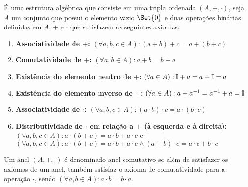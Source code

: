 \documentclass[../../main]{subfiles}
\begin{document}
    \begin{defi}[Anel]\label{defi:anel}
        É uma estrutura algébrica que consiste em uma tripla ordenada $(A,+,\cdot)$, seja $A$ um conjunto que possui o elemento vazio $\Set{0}$ e duas operações binárias definidas em $A$, $+$ e $\cdot$ que satisfazem os seguintes axiomas:

        \begin{enumerate}
            \item \textbf{Associatividade de $+$:} $(\forall a,b,c \in A): (a+b)+c=a+(b+c)$

            \item \textbf{Comutatividade de $+$:} $(\forall a,b \in A): a+b=b+a$

            \item \textbf{Existência do elemento neutro de $+$:} $(\forall a \in A): \mathbb{I}+a=a+\mathbb{I}=a$

            \item \textbf{Existência do elemento inverso de $+$:} $(\forall a \in A): a+a^{-1}=a^{-1}+a=\mathbb{I}$
            \item \textbf{Associatividade de $\cdot$:} $(\forall a,b,c \in A): (a\cdot b)\cdot c=a\cdot (b\cdot c)$

            \item \textbf{Distributividade de $\cdot$ em relação a $+$ (à esquerda e à direita):} $(\forall a,b,c \in A): a\cdot (b+c)=a\cdot b+a\cdot c$ e $(\forall a,b,c \in A): a \cdot (b+c)=a \cdot b+a \cdot c \wedge (a+b)\cdot c=a\cdot c+b\cdot c$
        \end{enumerate}
    \end{defi}

    \begin{defi}\label{defi:anel-comutativo}
        Um anel $(A,+,\cdot)$ é denominado anel comutativo se além de satisfazer os axiomas de um anel, também satisfaz o axioma de comutatividade para a operação $\cdot$, sendo $(\forall a,b \in A): a\cdot b=b\cdot a$.
    \end{defi}
\end{document}
